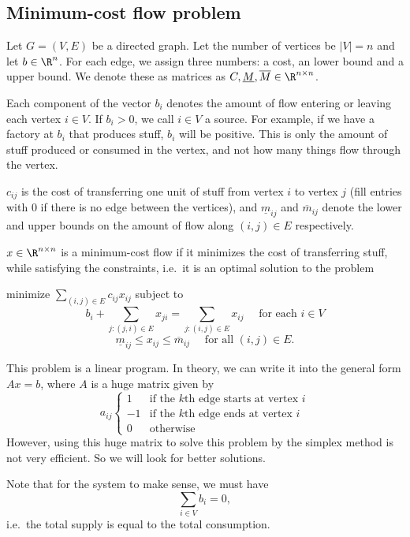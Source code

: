 \documentclass[a4paper]{article}
\begin{document}
\subsection{Minimum-cost flow problem}
Let $G = (V, E)$ be a directed graph. Let the number of vertices be $|V| = n$ and let $b\in \R^n$. For each edge, we assign three numbers: a cost, an lower bound and a upper bound. We denote these as matrices as $C, \underline{M}, \overline{M}\in \R^{n\times n}$.

Each component of the vector $b_i$ denotes the amount of flow entering or leaving each vertex $i\in V$. If $b_i > 0$, we call $i\in V$ a source. For example, if we have a factory at $b_i$ that produces stuff, $b_i$ will be positive. This is only the amount of stuff produced or consumed in the vertex, and not how many things flow through the vertex.

$c_{ij}$ is the cost of transferring one unit of stuff from vertex $i$ to vertex $j$ (fill entries with $0$ if there is no edge between the vertices), and $\underline{m}_{ij}$ and $\overline{m}_{ij}$ denote the lower and upper bounds on the amount of flow along $(i, j)\in E$ respectively.

$x\in \R^{n\times n}$ is a minimum-cost flow if it minimizes the cost of transferring stuff, while satisfying the constraints, i.e.\ it is an optimal solution to the problem
\begin{center}
  minimize $\displaystyle\sum_{(i, j)\in E}c_{ij}x_{ij}$ subject to
  \[
    b_i + \sum_{j: (j, i)\in E} x_{ji} = \sum_{j: (i, j)\in E}x_{ij}\quad\text{ for each }i\in V
  \]
  \[
    \underline{m}_{ij} \leq x_{ij}\leq \overline{m}_{ij}\quad\text{ for all }(i, j) \in E.
  \]
\end{center}
This problem is a linear program. In theory, we can write it into the general form $Ax = b$, where $A$ is a huge matrix given by
\[
  a_{ij}
  \begin{cases}
    1 & \text{if the $k$th edge starts at vertex }i\\
    -1 & \text{if the $k$th edge ends at vertex }i\\
    0 & \text{otherwise}
  \end{cases}
\]
However, using this huge matrix to solve this problem by the simplex method is not very efficient. So we will look for better solutions.

Note that for the system to make sense, we must have
\[
  \sum_{i\in V}b_i = 0,
\]
i.e.\ the total supply is equal to the total consumption.
\end{document}
